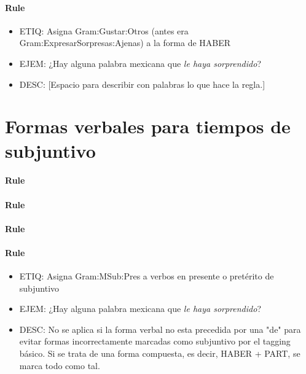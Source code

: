 \documentclass[11pt]{report}
\begin{document}
\paragraph*{Rule}
\begin{itemize}
\item ETIQ: Asigna Gram:Gustar:Otros (antes era Gram:ExpresarSorpresas:Ajenas) a la forma de HABER
\item EJEM: ¿Hay alguna palabra mexicana que \emph{le haya sorprendido}?
\item DESC: [Espacio para describir con palabras lo que hace la regla.]
\end{itemize}

\section{Formas verbales para tiempos de subjuntivo}
\paragraph*{Rule}
\paragraph*{Rule}
\paragraph*{Rule}
\paragraph*{Rule}
\begin{itemize}
\item ETIQ: Asigna Gram:MSub:Pres a verbos en presente o pretérito de subjuntivo
\item EJEM: ¿Hay alguna palabra mexicana que \emph{le haya sorprendido}?
\item DESC: No se aplica si la forma verbal no esta precedida por una "de" para evitar formas incorrectamente marcadas como subjuntivo por el tagging básico. Si se trata de una forma compuesta, es decir, HABER + PART, se marca todo como tal.
\end{itemize}
\end{document}
